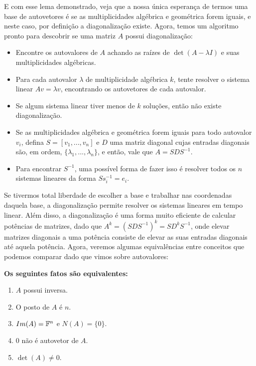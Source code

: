 \documentclass[11pt, a4paper]{article}
\begin{document}
\void[0.5]

E com esse lema demonstrado, veja que a nossa única esperança de termos uma base de autovetores é se as multiplicidades algébrica e geométrica forem iguais, e neste caso, por definição a diagonalização existe. Agora, temos um algoritmo pronto para descobrir se uma matriz \(A\) possui diagonalização:

\begin{itemize}
    \item Encontre os autovalores de \(A\) achando as raízes de \(\det(A-\lambda I)\) e suas multiplicidades algébricas.
    \item Para cada autovalor \(\lambda\) de multiplicidade algébrica \(k\), tente resolver o sistema linear \(Av=\lambda v\), encontrando os autovetores de cada autovalor. 
    \item Se algum sistema linear tiver menos de \(k\) soluções, então não existe diagonalização.
    \item Se as multiplicidades algébrica e geométrica forem iguais para todo autovalor \(v_i\), defina \(S=[v_1,...,v_n]\) e \(D\) uma matriz diagonal cujas entradas diagonais são, em ordem, \(\{\lambda_1,...,\lambda_n\}\), e então, vale que \(A=SDS^{-1}\).
    \item Para encontrar \(S^{-1}\), uma possível forma de fazer isso é resolver todos os \(n\) sistemas lineares da forma \(Ss^{-1}_i=e_i\).
\end{itemize}

Se tivermos total liberdade de escolher a base e trabalhar nas coordenadas daquela base, a diagonalização permite resolver os sistemas lineares em tempo linear. Além disso, a diagonalização é uma forma muito eficiente de calcular potências de matrizes, dado que \(A^k=(SDS^{-1})^k=SD^kS^{-1}\), onde elevar matrizes diagonais a uma potência consiste de elevar as suas entradas diagonais até aquela potência. Agora, veremos algumas equivalências entre conceitos que podemos comparar dado que vimos sobre autovalores:

\textbf{Os seguintes fatos são equivalentes:}
\begin{enumerate}
    \item \(A\) possui inversa.
    \item O posto de \(A\) é \(n\).
    \item \(Im(A)=\mathbb{F}^n\) e \(N(A)=\{0\}\).
    \item 0 não é autovetor de \(A\).
    \item \(\det(A)\ne 0\).
\end{enumerate}
\end{document}
